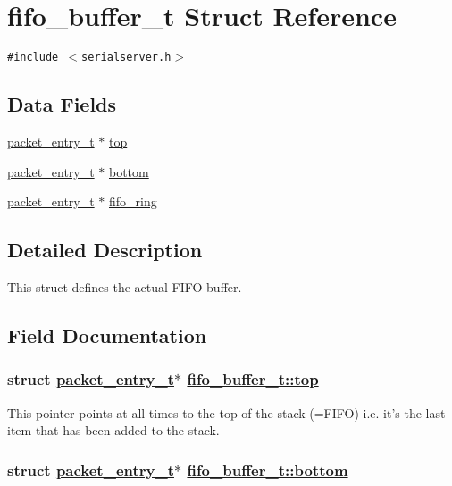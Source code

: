 \hypertarget{structfifo__buffer__t}{
\section{fifo\_\-buffer\_\-t Struct Reference}
\label{structfifo__buffer__t}
}
{\tt \#include $<$serialserver.h$>$}

\subsection*{Data Fields}
\begin{CompactItemize}
\item 
\hyperlink{structpacket__entry__t}{packet\_\-entry\_\-t} $\ast$ \hyperlink{structfifo__buffer__t_5daee039d39228d2a6346711d6d07bf4}{top}
\item 
\hyperlink{structpacket__entry__t}{packet\_\-entry\_\-t} $\ast$ \hyperlink{structfifo__buffer__t_423e4348f2849bd7d99d96d2df10efec}{bottom}
\item 
\hyperlink{structpacket__entry__t}{packet\_\-entry\_\-t} $\ast$ \hyperlink{structfifo__buffer__t_572f410339929c934f4c89e2e1a90b76}{fifo\_\-ring}
\end{CompactItemize}


\subsection{Detailed Description}
This struct defines the actual FIFO buffer. 



\subsection{Field Documentation}
\hypertarget{structfifo__buffer__t_5daee039d39228d2a6346711d6d07bf4}{
\subsubsection[top]{\setlength{\rightskip}{0pt plus 5cm}struct \hyperlink{structpacket__entry__t}{packet\_\-entry\_\-t}$\ast$ \hyperlink{structfifo__buffer__t_5daee039d39228d2a6346711d6d07bf4}{fifo\_\-buffer\_\-t::top}}}
\label{structfifo__buffer__t_5daee039d39228d2a6346711d6d07bf4}


This pointer points at all times to the top of the stack (=FIFO) i.e. it's the last item that has been added to the stack. \hypertarget{structfifo__buffer__t_423e4348f2849bd7d99d96d2df10efec}{
\subsubsection[bottom]{\setlength{\rightskip}{0pt plus 5cm}struct \hyperlink{structpacket__entry__t}{packet\_\-entry\_\-t}$\ast$ \hyperlink{structfifo__buffer__t_423e4348f2849bd7d99d96d2df10efec}{fifo\_\-buffer\_\-t::bottom}}}
\label{structfifo__buffer__t_423e4348f2849bd7d99d96d2df10efec}


